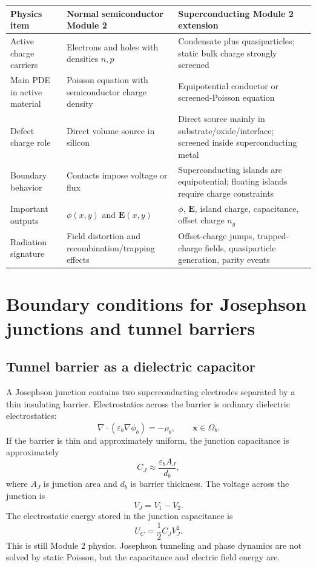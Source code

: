 \documentclass[11pt]{article}
\newcommand{\Evec}{\mathbf{E}}
\begin{document}
\begin{center}
\renewcommand{\arraystretch}{1.25}
\begin{tabularx}{0.96\textwidth}{p{}X X}
\toprule
\textbf{Physics item} & \textbf{Normal semiconductor Module 2} & \textbf{Superconducting Module 2 extension} \\
\midrule
Active charge carriers & Electrons and holes with densities $n,p$ & Condensate plus quasiparticles; static bulk charge strongly screened \\
Main PDE in active material & Poisson equation with semiconductor charge density & Equipotential conductor or screened-Poisson equation \\
Defect charge role & Direct volume source in silicon & Direct source mainly in substrate/oxide/interface; screened inside superconducting metal \\
Boundary behavior & Contacts impose voltage or flux & Superconducting islands are equipotential; floating islands require charge constraints \\
Important outputs & $\phi(x,y)$ and $\Evec(x,y)$ & $\phi$, $\Evec$, island charge, capacitance, offset charge $n_g$ \\
Radiation signature & Field distortion and recombination/trapping effects & Offset-charge jumps, trapped-charge fields, quasiparticle generation, parity events \\
\bottomrule
\end{tabularx}
\end{center}

\section{Boundary conditions for Josephson junctions and tunnel barriers}

\subsection{Tunnel barrier as a dielectric capacitor}

A Josephson junction contains two superconducting electrodes separated by a thin insulating barrier. Electrostatics across the barrier is ordinary dielectric electrostatics:
\begin{equation}
\nabla\cdot(\varepsilon_b\nabla\phi_b)=-\rho_b,
\qquad \mathbf{x}\in\Omega_b.
\end{equation}
If the barrier is thin and approximately uniform, the junction capacitance is approximately
\begin{equation}
C_J\approx \frac{\varepsilon_b A_J}{d_b},
\end{equation}
where $A_J$ is junction area and $d_b$ is barrier thickness. The voltage across the junction is
\begin{equation}
V_J=V_1-V_2.
\end{equation}
The electrostatic energy stored in the junction capacitance is
\begin{equation}
U_C=\frac{1}{2}C_J V_J^2.
\end{equation}
This is still Module 2 physics. Josephson tunneling and phase dynamics are not solved by static Poisson, but the capacitance and electric field energy are.
\end{document}
